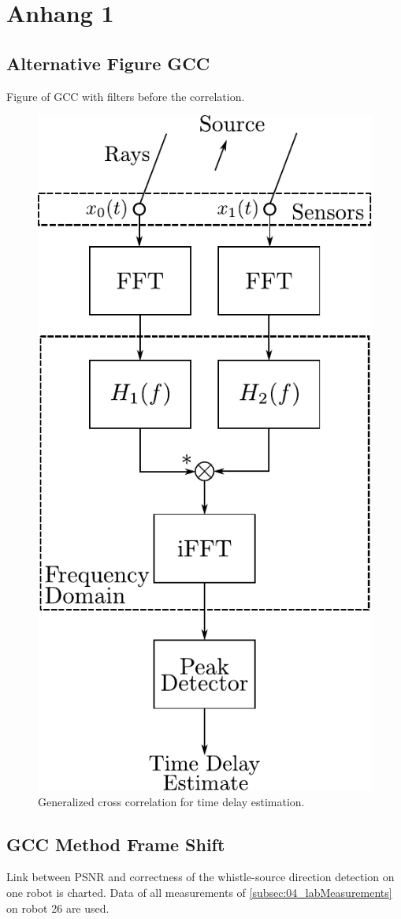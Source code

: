 \chapter{Anhang 1}
\label{chap:appendix1}

\section{Alternative Figure GCC}
\label{appendix:a1_alternativeGcc}

Figure of \ac{GCC} with filters before the correlation.
\begin{figure}[ht]
	\centering
		\includegraphics[width=0.35\columnwidth]{figures/GCC}
	\caption{Generalized cross correlation for time delay estimation.}
	\label{fig:ap1_GCC}
\end{figure}

\section{GCC Method Frame Shift}
\label{appendix:a1_gccFrameShift}

Link between \ac{PSNR} and correctness of the whistle-source direction
detection on one robot is charted.
Data of all measurements of \cref{subsec:04_labMeasurements} on robot 26
are used.

